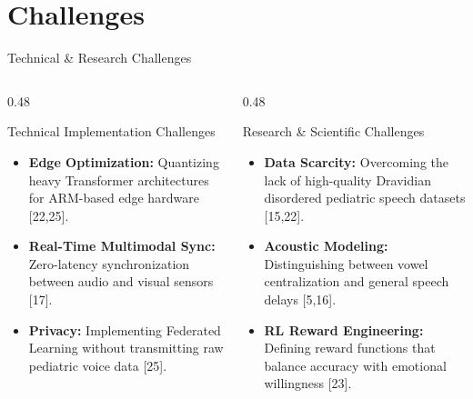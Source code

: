 \documentclass[aspectratio=169, 11pt]{beamer}
\begin{document}
\section{Challenges}
\begin{frame}{Technical \& Research Challenges}
\vspace{-4mm}
\begin{columns}[T, totalwidth=\textwidth]
\begin{column}{0.48\textwidth}
\begin{block}{\small Technical Implementation Challenges}
\scriptsize
\begin{itemize}
    \item \textbf{Edge Optimization:} Quantizing heavy Transformer architectures for ARM-based edge hardware [22,25].
    \item \textbf{Real-Time Multimodal Sync:} Zero-latency synchronization between audio and visual sensors [17].
    \item \textbf{Privacy:} Implementing Federated Learning without transmitting raw pediatric voice data [25].
\end{itemize}
\end{block}
\end{column}

\hspace{0.02\textwidth}
\begin{column}{0.48\textwidth}
\begin{block}{\small Research \& Scientific Challenges}
\scriptsize
\begin{itemize}
    \item \textbf{Data Scarcity:} Overcoming the lack of high-quality Dravidian disordered pediatric speech datasets [15,22].
    \item \textbf{Acoustic Modeling:} Distinguishing between vowel centralization and general speech delays [5,16].
    \item \textbf{RL Reward Engineering:} Defining reward functions that balance accuracy with emotional willingness [23].
\end{itemize}
\end{block}
\end{column}
\end{columns}
\end{frame}

\end{document}
